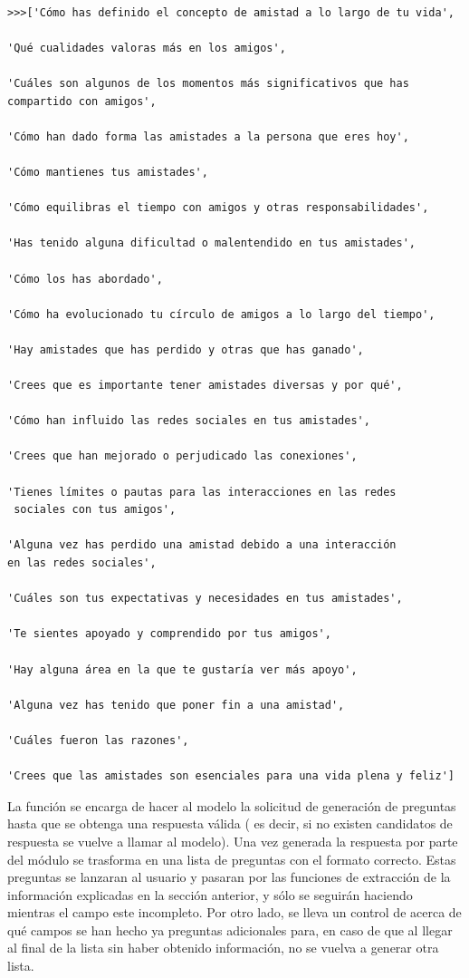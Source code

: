 \begin{verbatim}

>>>['Cómo has definido el concepto de amistad a lo largo de tu vida',

'Qué cualidades valoras más en los amigos',

'Cuáles son algunos de los momentos más significativos que has 
compartido con amigos',

'Cómo han dado forma las amistades a la persona que eres hoy',

'Cómo mantienes tus amistades',

'Cómo equilibras el tiempo con amigos y otras responsabilidades',

'Has tenido alguna dificultad o malentendido en tus amistades',

'Cómo los has abordado',

'Cómo ha evolucionado tu círculo de amigos a lo largo del tiempo',

'Hay amistades que has perdido y otras que has ganado',

'Crees que es importante tener amistades diversas y por qué',

'Cómo han influido las redes sociales en tus amistades',

'Crees que han mejorado o perjudicado las conexiones',

'Tienes límites o pautas para las interacciones en las redes
 sociales con tus amigos',
 
'Alguna vez has perdido una amistad debido a una interacción 
en las redes sociales',

'Cuáles son tus expectativas y necesidades en tus amistades',

'Te sientes apoyado y comprendido por tus amigos',

'Hay alguna área en la que te gustaría ver más apoyo',

'Alguna vez has tenido que poner fin a una amistad',

'Cuáles fueron las razones',

'Crees que las amistades son esenciales para una vida plena y feliz']

\end{verbatim}

La función se encarga de hacer al modelo la solicitud de generación de preguntas hasta que se obtenga una respuesta válida ( es decir, si no existen candidatos de respuesta se vuelve a llamar al modelo). Una vez generada la respuesta por parte del módulo se trasforma en una lista de preguntas con el formato correcto. Estas preguntas se lanzaran al usuario y pasaran por las funciones de extracción de la información explicadas en la sección anterior, y sólo se seguirán haciendo mientras el campo este incompleto. Por otro lado, se lleva un control de acerca de qué campos se han hecho ya preguntas adicionales para, en caso de que al llegar al final de la lista sin haber obtenido información, no se vuelva a generar otra lista. 
